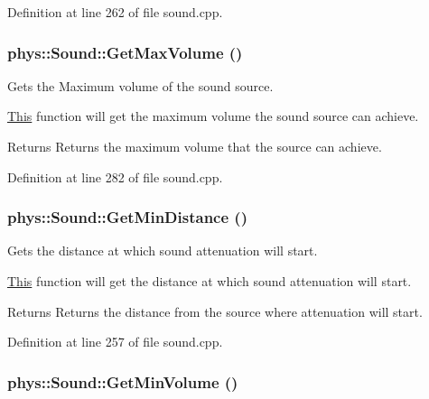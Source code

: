 Definition at line 262 of file sound.cpp.

\hypertarget{classphys_1_1Sound_aebda862caeda83fed2789f1e8bfca7ea}{
\subsubsection[{GetMaxVolume}]{ phys::Sound::GetMaxVolume ()}}
\label{dc/d2f/classphys_1_1Sound_aebda862caeda83fed2789f1e8bfca7ea}


Gets the Maximum volume of the sound source. 

\hyperlink{structThis}{This} function will get the maximum volume the sound source can achieve. \begin{DoxyReturn}{Returns}
Returns the maximum volume that the source can achieve. 
\end{DoxyReturn}


Definition at line 282 of file sound.cpp.

\hypertarget{classphys_1_1Sound_a45534a33db7c3aec3861b44327925bc2}{
\subsubsection[{GetMinDistance}]{ phys::Sound::GetMinDistance ()}}
\label{dc/d2f/classphys_1_1Sound_a45534a33db7c3aec3861b44327925bc2}


Gets the distance at which sound attenuation will start. 

\hyperlink{structThis}{This} function will get the distance at which sound attenuation will start. \begin{DoxyReturn}{Returns}
Returns the distance from the source where attenuation will start. 
\end{DoxyReturn}


Definition at line 257 of file sound.cpp.

\hypertarget{classphys_1_1Sound_a366c57366bbbfc13eea18e1908f19eb4}{
\subsubsection[{GetMinVolume}]{ phys::Sound::GetMinVolume ()}}
\label{dc/d2f/classphys_1_1Sound_a366c57366bbbfc13eea18e1908f19eb4}


